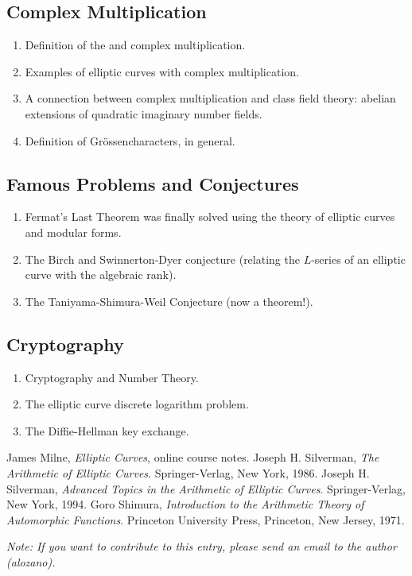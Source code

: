 \documentclass[12pt]{article}
\begin{document}
\subsection{Complex Multiplication}
\begin{enumerate}
\item Definition of the  and complex multiplication.
\item Examples of elliptic curves with complex multiplication.
\item A connection between complex multiplication and class field theory: abelian extensions of quadratic imaginary number fields.
\item Definition of Gr\"ossencharacters, in general.
\end{enumerate}

\subsection{Famous Problems and Conjectures}
\begin{enumerate}
\item Fermat's Last Theorem was finally solved using the theory of elliptic curves and modular forms.
\item The Birch and Swinnerton-Dyer conjecture (relating the $L$-series of an elliptic curve with the algebraic rank).
\item The Taniyama-Shimura-Weil Conjecture (now a theorem!).
\end{enumerate}

\subsection{Cryptography}

\begin{enumerate}
\item Cryptography and Number Theory.
\item The elliptic curve discrete logarithm problem.
\item The Diffie-Hellman key exchange.
\end{enumerate}

\begin{thebibliography}{9}
 James Milne, {\em Elliptic Curves}, online course notes. 
 Joseph H. Silverman, {\em The Arithmetic of Elliptic Curves}. Springer-Verlag, New York, 1986.
 Joseph H. Silverman, {\em Advanced Topics in
the Arithmetic of Elliptic Curves}. Springer-Verlag, New York,
1994.
 Goro Shimura, {\em Introduction to the
Arithmetic Theory of Automorphic Functions}. Princeton University
Press, Princeton, New Jersey, 1971.
\end{thebibliography}

{\it Note: If you want to contribute to this entry, please send an email to the author (alozano).}
\end{document}
